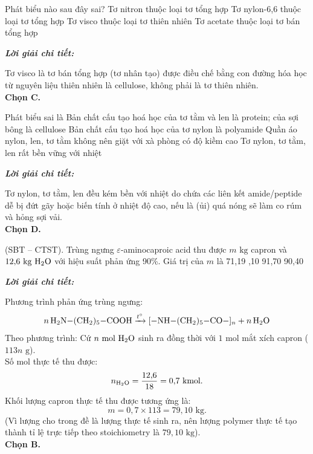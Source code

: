 \documentclass[11pt,a4paper]{article}
\def\loigiai#1{
\par\begingroup\color{blue!80!black}\small
\noindent\textbf{\textit{Lời giải chi tiết:}}\par
#1\par\endgroup}
\begin{document}
\begin{ex}
Phát biểu nào sau đây sai?
\choice
{Tơ nitron thuộc loại tơ tổng hợp}
{Tơ nylon-6,6 thuộc loại tơ tổng hợp}
{\True Tơ visco thuộc loại tơ thiên nhiên}
{Tơ acetate thuộc loại tơ bán tổng hợp}
\loigiai{
Tơ visco là tơ bán tổng hợp (tơ nhân tạo) được điều chế bằng con đường hóa học từ nguyên liệu thiên nhiên là cellulose, không phải là tơ thiên nhiên.\\
\textbf{Chọn C.}}
\end{ex}

\begin{ex}
Phát biểu sai là
\choice
{Bản chất cấu tạo hoá học của tơ tằm và len là protein; của sợi bông là cellulose}
{Bản chất cấu tạo hoá học của tơ nylon là polyamide}
{Quần áo nylon, len, tơ tằm không nên giặt với xà phòng có độ kiềm cao}
{\True Tơ nylon, tơ tằm, len rất bền vững với nhiệt}
\loigiai{
Tơ nylon, tơ tằm, len đều kém bền với nhiệt do chứa các liên kết amide/peptide dễ bị đứt gãy hoặc biến tính ở nhiệt độ cao, nếu là (ủi) quá nóng sẽ làm co rúm và hỏng sợi vải.\\
\textbf{Chọn D.}}
\end{ex}

\begin{ex}
(SBT -- CTST). Trùng ngưng $\varepsilon$-aminocaproic acid thu được $m\text{ kg}$ capron và $12{,}6\text{ kg } \ce{H2O}$ với hiệu suất phản ứng 90\%. Giá trị của $m$ là
\choice
{71,19}
{,10}
{91,70}
{90,40}
\loigiai{
Phương trình phản ứng trùng ngưng:
$$n\,\ce{H2N-(CH2)5-COOH} \xrightarrow{t^\circ} \ce{[-NH-(CH2)5-CO-]_n} + n\,\ce{H2O}$$
Theo phương trình: Cứ $n\text{ mol } \ce{H2O}$ sinh ra đồng thời với $1\text{ mol}$ mắt xích capron ($113n\text{ g}$).\\
Số mol \ce{H2O} thực tế thu được:
$$n_{\ce{H2O}} = \frac{12{,}6}{18} = 0{,}7\text{ kmol.}$$
Khối lượng capron thực tế thu được tương ứng là:
$$m = 0{,}7 \times 113 = 79{,}10\text{ kg.}$$
(Vì lượng \ce{H2O} cho trong đề là lượng thực tế sinh ra, nên lượng polymer thực tế tạo thành tỉ lệ trực tiếp theo stoichiometry là $79{,}10\text{ kg}$).\\
\textbf{Chọn B.}}
\end{ex}
\end{document}
